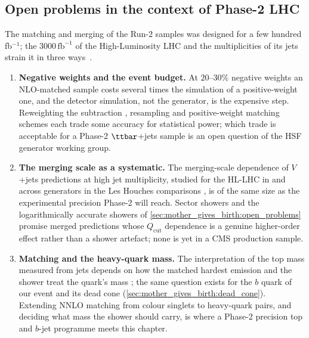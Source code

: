 \subsection*{Open problems in the context of Phase-2 LHC}
\label{sec:whose_child:open_problems}

The matching and merging of the Run-2 samples was designed for a few
hundred fb$^{-1}$; the $3000\,\mathrm{fb}^{-1}$ of the High-Luminosity
LHC and the multiplicities of its jets strain it in three
ways~\cite{Azzi:2019yne,HSFPhysicsEventGeneratorWG:2020gxw}.
\begin{enumerate}
  \item \textbf{Negative weights and the event budget.} At $20$--$30\%$
    negative weights an NLO-matched sample costs several times the
    simulation of a positive-weight one, and the detector simulation, not
    the generator, is the expensive step. Reweighting the subtraction
    \cite{Frederix:2020trv}, resampling \cite{Andersen:2020sjs} and
    positive-weight matching schemes \cite{Danziger:2021xvr} each trade
    some accuracy for statistical power; which trade is acceptable for a
    Phase-2 $\ttbar$+jets sample is an open question of the HSF generator
    working group.
  \item \textbf{The merging scale as a systematic.} The merging-scale
    dependence of $V$+jets predictions at high jet multiplicity, studied for
    the HL-LHC in \cite{Hoche:2019flt} and across generators in the Les
    Houches comparisons \cite{Amoroso:2020lgh}, is of the same size as the
    experimental precision Phase-2 will reach. Sector showers
    \cite{Brooks:2020mab} and the logarithmically accurate showers of
    \cref{sec:mother_gives_birth:open_problems} promise merged predictions
    whose $Q_{\mathrm{cut}}$ dependence is a genuine higher-order effect
    rather than a shower artefact; none is yet in a CMS production sample.
  \item \textbf{Matching and the heavy-quark mass.} The interpretation of
    the top mass measured from jets depends on how the matched hardest
    emission and the shower treat the quark's mass
    \cite{Nason:2017cxd,Hoang:2020iah}; the same question exists for the
    $b$ quark of our event and its dead cone
    (\cref{sec:mother_gives_birth:dead_cone}). Extending NNLO matching
    \cite{Monni:2019whf} from colour singlets to heavy-quark pairs, and
    deciding what mass the shower should carry, is where a Phase-2
    precision top and $b$-jet programme meets this chapter.
\end{enumerate}
